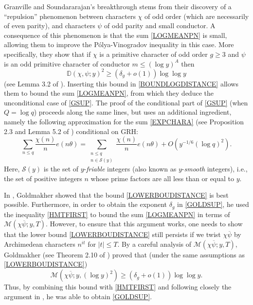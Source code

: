 \documentclass[12pt]{amsart}
\theoremstyle{definition}
\numberwithin{equation}{section}
\newcommand{\mb}{\mathbb}
\newcommand{\mc}{\mathcal}
\renewcommand{\bar}{\overline}
\begin{document}
Granville and Soundararajan's breakthrough stems from their discovery of a ``repulsion'' phenomenon between characters $\chi$ of odd order (which are necessarily of even parity), and characters $\psi$ of odd parity and small conductor. A consequence of this phenomenon is that the sum \eqref{LOGMEANPN} is small, allowing them to improve the P\'olya-Vinogradov inequality in this case. 
More specifically, they show that if $\chi$ is a primitive character of odd order $g\geq 3$ and $\psi$ is an odd primitive character of conductor $m\leq (\log y)^A$ then  
 \begin{equation}\label{LOWERBOUDISTANCE}
 \mb{D}(\chi,\psi;y)^2\geq (\delta_g+o(1))\log\log y
 \end{equation}
(see Lemma 3.2 of \cite{GrSo2}). Inserting this bound in \eqref{BOUNDLOGDISTANCE} allows them to bound the sum \eqref{LOGMEANPN}, from which they deduce the unconditional case of \eqref{GSUP}. The proof of the conditional part of \eqref{GSUP} (when $Q=\log q$) proceeds along the same lines, but uses an additional ingredient, namely the following approximation for the sum \eqref{EXPCHARA} (see Proposition 2.3 and Lemma 5.2 of \cite{GrSo2}) conditional on GRH:
\begin{equation}\label{APPROXFRIABLE}
\sum_{n\leq q}\frac{\chi(n)}{n} e(n\theta)= \sum_{\substack{n\leq q \\ n \in \mc{S}(y)}}\frac{\chi(n)}{n} e(n\theta)+O\left(y^{-1/6}(\log q)^2\right).
\end{equation}
Here, $\mc{S}(y)$ is the set of $y$-\emph{friable} integers (also known as $y$-\emph{smooth} integers), i.e., the set of positive integers $n$ whose prime factors are all less than or equal to $y$.

In \cite{GOLD}, Goldmakher showed that the bound \eqref{LOWERBOUDISTANCE} is best possible. Furthermore, in order to obtain the exponent $\delta_g$ in \eqref{GOLDSUP}, he used the inequality \eqref{HMTFIRST} to bound the sum \eqref{LOGMEANPN} in terms of $\mc{M}(\chi\bar{\psi};y, T)$. However, to ensure that this argument works, one needs to show that the lower bound \eqref{LOWERBOUDISTANCE} still persists if we twist $\chi\bar{\psi}$ by Archimedean characters $n^{it}$ for $|t|\leq T$. By a careful analysis of 
$\mc{M}(\chi\bar{\psi};y,T)$, Goldmakher (see Theorem 2.10 of \cite{GOLD}) proved that (under the same assumptions as \eqref{LOWERBOUDISTANCE})
\begin{equation}\label{LBDGOLD}
\mc{M}(\chi\bar{\psi};y,(\log y)^2)\geq (\delta_g+o(1))\log\log y.
\end{equation}
Thus, by combining this bound with \eqref{HMTFIRST} and following closely the argument in \cite{GrSo2}, he was able to obtain \eqref{GOLDSUP}. 
\end{document}
